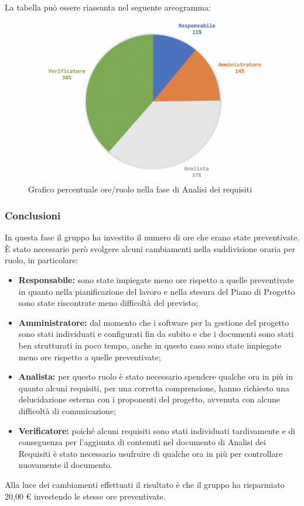 			La tabella può essere riassunta nel seguente areogramma:
			\begin{figure}[H]
				\centering
				\includegraphics[width=0.8\linewidth]{./images/analisiCons2.png}
				\caption{Grafico percentuale ore/ruolo nella fase di Analisi dei requisiti}
				\label{fig:grafico costi ruolo fase Analisi}
			\end{figure}
		
		\subsubsection{Conclusioni}
			In questa fase il gruppo ha investito il numero di ore che erano state preventivate. È stato necessario però svolgere alcuni cambiamenti nella suddivisione oraria per ruolo, in particolare:
			\begin{itemize}
				\item \textbf{Responsabile:} sono state impiegate meno ore rispetto a quelle preventivate in quanto nella pianificazione del lavoro e nella stesura del Piano di Progetto sono state riscontrate meno difficoltà del previsto;	 
				\item \textbf{Amministratore:} dal momento che i software per la gestione del progetto sono stati individuati e configurati fin da subito e che i documenti sono stati ben strutturati in poco tempo, anche in questo caso sono state impiegate meno ore rispetto a quelle preventivate;	 
				\item \textbf{Analista:} per questo ruolo è stato necessario spendere qualche ora in più in quanto alcuni requisiti, per una corretta comprensione, hanno richiesto una delucidazione esterna con i proponenti del progetto, avvenuta con alcune difficoltà di comunicazione;
				\item \textbf{Verificatore:} poiché alcuni requisiti sono stati individuati tardivamente e di conseguenza per l'aggiunta di contenuti nel documento di Analisi dei Requisiti è stato necessario usufruire di qualche ora in più per controllare nuovamente il documento.
			\end{itemize}
			Alla luce dei cambiamenti effettuati il risultato è che il gruppo ha risparmiato 20,00 € investendo le stesse ore preventivate.
		
